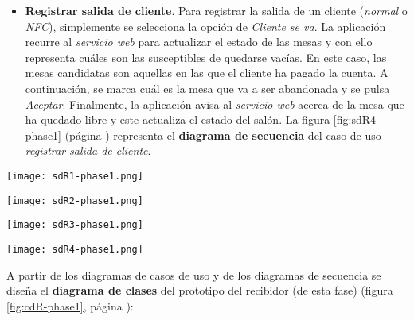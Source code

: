 \begin{itemize}
\item \textbf{Registrar salida de cliente}. Para registrar la salida de un
cliente (\emph{normal} o \emph{\acs{NFC}}), simplemente se selecciona la
opción de \emph{Cliente se va}. La aplicación recurre al \emph{servicio web}
para actualizar el estado de las mesas y con ello representa cuáles son las
susceptibles de quedarse vacías. En este caso, las mesas candidatas son
aquellas en las que el cliente ha pagado la cuenta. A continuación, se marca
cuál es la mesa que va a ser abandonada y se pulsa \emph{Aceptar}. Finalmente,
la aplicación avisa al \emph{servicio web} acerca de la mesa que ha quedado
libre y este actualiza el estado del salón. La figura \ref{fig:sdR4-phase1}
(página \pageref{fig:sdR4-phase1}) representa el \textbf{diagrama de secuencia}
del caso de uso \emph{registrar salida de cliente}.
\end{itemize}

  \begin{sidewaysfigure}[hp]
    \begin{center}
      \texttt{[image: sdR1-phase1.png]}
      \caption{Diagrama de secuencia del caso de uso \emph{iniciar nueva
      jornada}.}
      \label{fig:sdR1-phase1}
    \end{center}
  \end{sidewaysfigure}

  \begin{sidewaysfigure}[hp]
    \begin{center}
      \texttt{[image: sdR2-phase1.png]}
      \caption{Diagrama de secuencia del caso de uso \emph{iniciar jornada
      existente}.}
      \label{fig:sdR2-phase1}
    \end{center}
  \end{sidewaysfigure}

  \begin{sidewaysfigure}[hp]
    \begin{center}
      \texttt{[image: sdR3-phase1.png]}
      \caption{Diagrama de secuencia del caso de uso \emph{registrar llegada
      de cliente}.}
      \label{fig:sdR3-phase1}
    \end{center}
  \end{sidewaysfigure}

  \begin{sidewaysfigure}[hp]
    \begin{center}
      \texttt{[image: sdR4-phase1.png]}
      \caption{Diagrama de secuencia del caso de uso \emph{registrar salida
      de cliente}.}
      \label{fig:sdR4-phase1}
    \end{center}
  \end{sidewaysfigure}
\newpage
A partir de los diagramas de casos de uso y de los diagramas de secuencia se
diseña el \textbf{diagrama de clases} del prototipo del recibidor (de esta
fase) (figura \ref{fig:cdR-phase1}, página \pageref{fig:cdR-phase1}):

